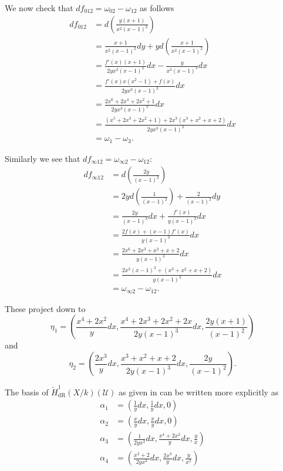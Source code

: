 \documentclass[draft, 11pt]{article} %
\theoremstyle{plain}
\theoremstyle{remark}
\newcommand{\cU}{{\mathcal U}}
\newcommand{\cechderhamhone}{\check{H}_{\text {dR}}^1(X/k)}
\begin{document}
We now check that $df_{0 1 2} = \omega_{0 2} - \omega_{1 2}$ as follows
\begin{align*}
df_{0 1 2} & = d\left(\frac{y(x+1)}{x^2(x-1)^2} \right) \\
& = \frac{x+1}{x^2(x-1)^2}dy + y d\left( \frac{x+1}{x^2(x-1)^2} \right) \\
& = \frac{f'(x)(x+1)}{2yx^2(x-1)^2} dx - \frac{y}{x^3(x-1)^3}dx \\
& = \frac{f'(x)x(x^2-1) + f(x)}{2yx^3(x-1)^3}dx \\
& = \frac{2x^6 + 2x^4 + 2x^2 +1}{2yx^3(x-1)^3} dx \\
& = \frac{(x^5 + 2x^3 + 2x^2 + 1) + 2x^3(x^3 + x^2 + x + 2)}{2yx^3(x-1)^3}dx \\
& = \omega_1 - \omega_3.
\end{align*}

Similarly we see that $df_{\infty 1 2} = \omega_{\infty 2} - \omega_{1 2}$:
\begin{align*}
df_{\infty 1 2} & = d \left( \frac{2y}{(x-1)^2} \right) \\
& = 2y d\left( \frac{1}{(x-1)^2} \right) + \frac{2}{(x-1)^2} dy \\
& = \frac{2y}{(x-1)^3}dx + \frac{f'(x)}{y(x-1)^2}dx \\
& = \frac{2f(x) + (x-1)f'(x)}{y(x-1)^3} dx \\
& = \frac{2x^6 + 2x^3 + x^2 + x + 2}{y(x-1)^3} dx \\
& = \frac{2x^3(x-1)^3 + (x^3 + x^2 + x + 2)}{y(x-1)^3}dx \\
& = \omega_{\infty 2} - \omega_{12}.
\end{align*}

These project down to 
\[
\eta_1 = \left( \frac{x^4 + 2x^2}{y}dx , \frac{x^4 + 2x^3 + 2x^2 + 2x}{2y(x-1)^3}dx, \frac{2y(x+1)}{(x-1)^2} \right)
\]
and
\[
\eta_2 = \left(\frac{2x^3}{y}dx, \frac{x^3+x^2+x+2}{2y(x-1)^3}dx, \frac{2y}{(x-1)^2} \right).
\]

The basis of $\cechderhamhone (\cU)$ as given in \cite{derhamactions} can be written more explicitly as 
\begin{align*}
\alpha_1 & = \left( \frac{1}{y}dx, \frac{1}{y}dx, 0 \right) \\
\alpha_2 & = \left( \frac{x}{y}dx, \frac{x}{y}dx, 0 \right) \\
\alpha_3 & = \left( \frac{1}{2yx^2}dx, \frac{x^4 + 2x^2}{y}dx, \frac{y}{x} \right) \\
\alpha_4 & = \left( \frac{x^2 + 2}{2yx^3}dx, \frac{2x^3}{y}dx, \frac{y}{x^2} \right)
\end{align*}
\end{document}
